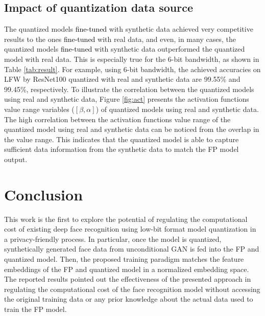 \documentclass[a4paper,conference]{IEEEtran}
\begin{document}
\vspace{-1mm}
\subsection{Impact of quantization data source}
\label{sec:data_source}
\vspace{-1mm}
The quantized models \textcolor{black}{fine-tuned} with synthetic data achieved very competitive results to the ones \textcolor{black}{fine-tuned} with real data, and even, in many cases, the quantized models \textcolor{black}{fine-tuned} with synthetic data outperformed the quantized model with real data. This is especially true for the 6-bit bandwidth, as shown in Table \ref{tab:result}. For example, using 6-bit bandwidth, the achieved accuracies on LFW by ResNet100 quantized with real and synthetic data are 99.55\% and 99.45\%, respectively.
To illustrate the correlation between the quantized models using real and synthetic data, Figure \ref{fig:act} presents the activation functions value range variables ($[\beta,\alpha]$) of quantized models using real and synthetic data. The high correlation between the activation functions value range of the quantized model using real and synthetic data can be noticed from the overlap in the value range. This indicates that the quantized model is able to capture sufficient data information from the synthetic data to match the FP model output.




























\vspace{-1mm}
\section{Conclusion}
\label{sec:conc}
\vspace{-1mm}
This work is the first to explore the potential of regulating the computational cost of existing deep face recognition using low-bit format model quantization in a privacy-friendly process.
In particular, once the model is quantized, synthetically generated face data from unconditional GAN is fed into the FP and quantized model. 
Then, the proposed training paradigm matches the feature embeddings of the FP and quantized model in a normalized embedding space. 
The reported results pointed out the effectiveness of the presented approach in regulating the computational cost of the face recognition model without accessing the original training data or any prior knowledge about the actual data used to train the FP model. 
\end{document}
